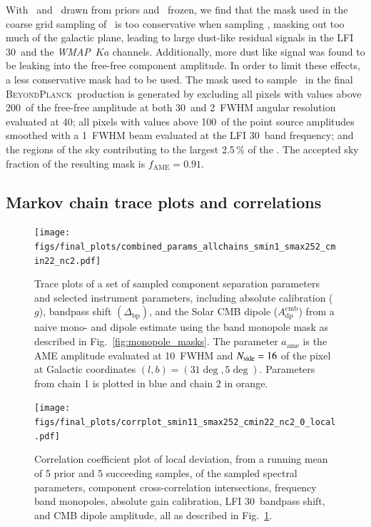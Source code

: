 \documentclass[twocolumn]{aa}
\def\WMAP{\emph{WMAP}}
\newcommand{\BP}{\textsc{BeyondPlanck}}
\begin{document}
With \bsynch\ and \bdust\ drawn from priors and \Te\ frozen,
we find that the mask used in the coarse grid sampling of \nup\
is too conservative when sampling \nup, masking out too much of the
galactic plane, leading to large dust-like residual signals in the
LFI 30\GHz\ and the \WMAP\ $Ka$ channels. Additionally, more dust like
signal was found to be leaking into the free-free component amplitude.
In order to limit these effects, a less conservative mask had to be used.
The mask used to sample \nup\ in the final \BP\ production is
generated by excluding all pixels with values above 200\muKRJ\ of the
free-free amplitude at both 30\arcm\ and 2\deg\ FWHM angular
resolution evaluated at 40\GHz; all pixels with values above
100\muKRJ\ of the point source amplitudes smoothed with a 1\deg\ FWHM
beam evaluated at the LFI 30\GHz\ band frequency; and the regions of the
sky contributing to the largest 2.5\,\% of the \chisq.  The accepted
sky fraction of the resulting mask is $f_{\mathrm{AME}} = 0.91$.


\subsection{Markov chain trace plots and correlations}
\label{sec:traceplots}

\begin{figure}
  \center	
  \texttt{[image: figs/final\_plots/combined\_params\_allchains\_smin1\_smax252\_cmin22\_nc2.pdf]}
  \caption{Trace plots of a set of sampled component separation parameters and selected instrument parameters, including absolute calibration ($g$), bandpass shift $(\Delta_{\mathrm{bp}})$, and the Solar CMB dipole ($A_{\mathrm{dp}}^{\mathrm{cmb}}$) from a naive mono- and dipole estimate using the band monopole mask as described in Fig.~\ref{fig:monopole_masks}. The parameter $a_{\mathrm{ame}}$ is the AME amplitude evaluated at 10\deg\ FWHM and $\nside=16$ of the pixel at Galactic coordinates $(l,b)=(31\deg,5\deg)$. Parameters from chain 1 is plotted in blue and chain 2 in orange. 
    }
  \label{fig:param_traceplot}
\end{figure}

\begin{figure}
  \center	
  \texttt{[image: figs/final\_plots/corrplot\_smin11\_smax252\_cmin22\_nc2\_0\_local.pdf]}
  \caption{Correlation coefficient plot of local deviation, from a running mean of 5 prior and 5 succeeding samples, of the sampled spectral parameters, component cross-correlation intersections, frequency band monopoles, absolute gain calibration, LFI 30\GHz\ bandpass shift, and CMB dipole amplitude, all as described in Fig.~\ref{fig:param_traceplot}.
    }
  \label{fig:param_corr_local}
\end{figure}
\end{document}
